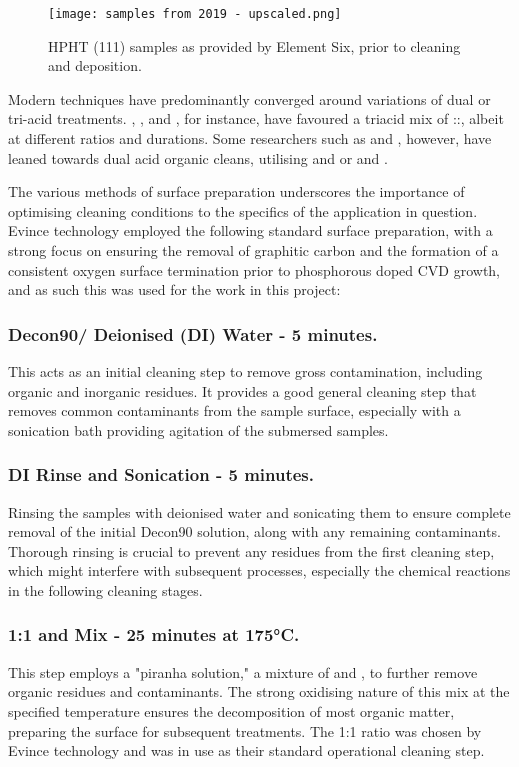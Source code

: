 \begin{figure}[h]
\centering
\texttt{[image: samples from 2019 - upscaled.png]}
\caption{HPHT (111) samples as provided by Element Six, prior to cleaning and deposition.}
\label{fig:111_samples}
\end{figure}

Modern techniques have predominantly converged around variations of dual or tri-acid treatments. \cite{koizumi2000}, \cite{teraji2000,teraji2003}, and \cite{kociniewski2006,kociniewski2007}, for instance, have favoured a triacid mix of ::, albeit at different ratios and durations. Some researchers such as \cite{kato2005,kato2009} and \cite{suzuki2004}, however, have leaned towards dual acid organic cleans, utilising  and  or  and . 

The various methods of surface preparation underscores the importance of optimising cleaning conditions to the specifics of the application in question. Evince technology employed the following standard surface preparation, with a strong focus on ensuring the removal of graphitic carbon and the formation of a consistent oxygen surface termination prior to phosphorous doped CVD growth, and as such this was used for the work in this project:

\subsubsection{Decon90/ Deionised (DI) Water - 5 minutes.}
This acts as an initial cleaning step to remove gross contamination, including organic and inorganic residues. It provides a good general cleaning step that removes common contaminants from the sample surface, especially with a sonication bath providing agitation of the submersed samples. 

\subsubsection{DI Rinse and Sonication - 5 minutes.}
Rinsing the samples with deionised water and sonicating them to ensure complete removal of the initial Decon90 solution, along with any remaining contaminants. Thorough rinsing is crucial to prevent any residues from the first cleaning step, which might interfere with subsequent processes, especially the chemical reactions in the following cleaning stages.

\subsubsection{1:1  and  Mix - 25 minutes at 175\si{\degreeCelsius}.}
This step employs a "piranha solution," a mixture of  and , to further remove organic residues and contaminants. The strong oxidising nature of this mix at the specified temperature ensures the decomposition of most organic matter, preparing the surface for subsequent treatments. The 1:1 ratio was chosen by Evince technology and was in use as their standard operational cleaning step.

